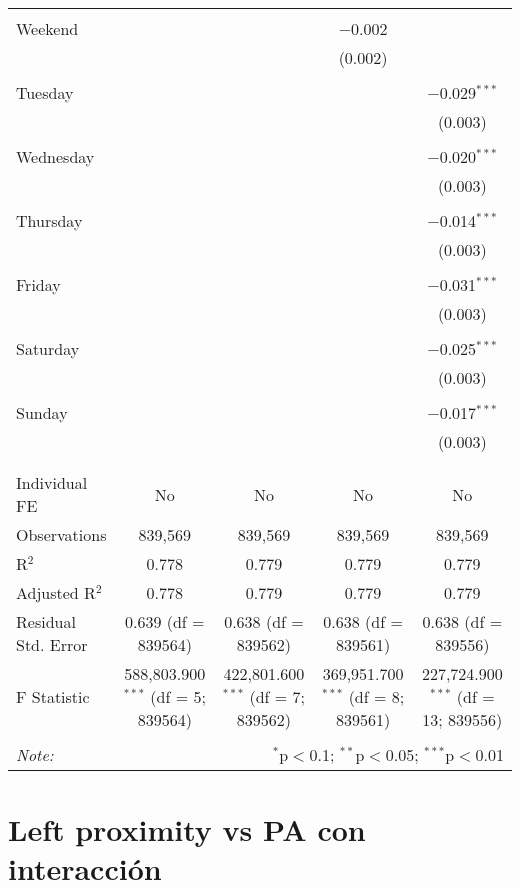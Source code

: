 \documentclass[
]{article}
\begin{document}
\begin{table}[!htbp]
{\begin{tabular}{@{\extracolsep{5pt}}lcccc}
  & & & & \\ 
 Weekend &  &  & $-$0.002 &  \\ 
  &  &  & (0.002) &  \\ 
  & & & & \\ 
 Tuesday &  &  &  & $-$0.029$^{***}$ \\ 
  &  &  &  & (0.003) \\ 
  & & & & \\ 
 Wednesday &  &  &  & $-$0.020$^{***}$ \\ 
  &  &  &  & (0.003) \\ 
  & & & & \\ 
 Thursday &  &  &  & $-$0.014$^{***}$ \\ 
  &  &  &  & (0.003) \\ 
  & & & & \\ 
 Friday &  &  &  & $-$0.031$^{***}$ \\ 
  &  &  &  & (0.003) \\ 
  & & & & \\ 
 Saturday &  &  &  & $-$0.025$^{***}$ \\ 
  &  &  &  & (0.003) \\ 
  & & & & \\ 
 Sunday &  &  &  & $-$0.017$^{***}$ \\ 
  &  &  &  & (0.003) \\ 
  & & & & \\ 
\hline \\[-1.8ex] 
Individual FE & No & No & No & No \\ 
Observations & 839,569 & 839,569 & 839,569 & 839,569 \\ 
R$^{2}$ & 0.778 & 0.779 & 0.779 & 0.779 \\ 
Adjusted R$^{2}$ & 0.778 & 0.779 & 0.779 & 0.779 \\ 
Residual Std. Error & 0.639 (df = 839564) & 0.638 (df = 839562) & 0.638 (df = 839561) & 0.638 (df = 839556) \\ 
F Statistic & 588,803.900$^{***}$ (df = 5; 839564) & 422,801.600$^{***}$ (df = 7; 839562) & 369,951.700$^{***}$ (df = 8; 839561) & 227,724.900$^{***}$ (df = 13; 839556) \\ 
\hline 
\hline \\[-1.8ex] 
\textit{Note:}  & \multicolumn{4}{r}{$^{*}$p$<$0.1; $^{**}$p$<$0.05; $^{***}$p$<$0.01} \\ 
\end{tabular}
} 
\end{table} 
\newpage
\section{Left proximity vs PA con interacción}
\end{document}
